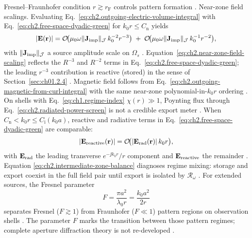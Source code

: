 Fresnel--Fraunhofer condition \(r\gtrsim r_{\mathrm{F}}\) controls pattern formation
\cite{harrington2001}.
Near-zone field scalings. Evaluating Eq.~\eqref{eq:ch2.outgoing-electric-volume-integral} with
Eq.~\eqref{eq:ch2.free-space-dyadic-green} for \(k_0 r\le C_{\mathrm{n}}\) yields
\begin{equation}
\label{eq:ch2.near-zone-field-scaling}
|\mathbf{E}(\mathbf{r})|
=
\mathcal{O}\!\big(\mu_0\omega\|\mathbf{J}_{\mathrm{imp}}\|_{\mathcal{J}}\,k_0^{-2} r^{-3}\big)
\;+\;
\mathcal{O}\!\big(\mu_0\omega\|\mathbf{J}_{\mathrm{imp}}\|_{\mathcal{J}}\,k_0^{-1} r^{-2}\big),
\end{equation}
with \(\|\mathbf{J}_{\mathrm{imp}}\|_{\mathcal{J}}\) a source amplitude scale on \(\Omega_s\)
\cite{stratton1941}. Equation~\eqref{eq:ch2.near-zone-field-scaling} reflects
the \(R^{-3}\) and \(R^{-2}\) terms in Eq.~\eqref{eq:ch2.free-space-dyadic-green}; the
leading \(r^{-3}\) contribution is reactive (stored) in the sense of
Section~\ref{sec:ch01.2.4} \cite{stratton1941}. Magnetic field follows from
Eq.~\eqref{eq:ch2.outgoing-magnetic-from-curl-integral} with the same near-zone
polynomial-in-\(k_0 r\) ordering \cite{harrington2001}. On shells with
Eq.~\eqref{eq:ch1.regime-index} \(\chi(r)\gg 1\), Poynting flux through
Eq.~\eqref{eq:ch2.radiated-power-screen} is not a credible export meter
\cite{stratton1941}.
When \(C_{\mathrm{n}}<k_0 r\le C_{\mathrm{i}}(k_0 a)\), reactive and radiative terms in
Eq.~\eqref{eq:ch2.free-space-dyadic-green} are comparable:
\begin{equation}
\label{eq:ch2.intermediate-zone-balance}
|\mathbf{E}_{\mathrm{reactive}}(\mathbf{r})|
=
\mathcal{O}\!\big(|\mathbf{E}_{\mathrm{rad}}(\mathbf{r})|\,k_0 r\big),
\end{equation}
with \(\mathbf{E}_{\mathrm{rad}}\) the leading transverse \(e^{-\jj k_0 r}/r\) component and
\(\mathbf{E}_{\mathrm{reactive}}\) the remainder \cite{stratton1941}. Equation
\eqref{eq:ch2.intermediate-zone-balance} diagnoses regime mixing: storage and export coexist
in the full field pair until export is isolated by \(\mathcal{R}_\omega\)
\cite{stratton1941}. For extended sources, the Fresnel parameter
\begin{equation}
\label{eq:ch2.fresnel-parameter}
F
=
\frac{\pi a^{2}}{\lambda_0 r}
=
\frac{k_0 a^{2}}{2r}
\end{equation}
separates Fresnel (\(F\gtrsim 1\)) from Fraunhofer (\(F\ll 1\)) pattern regions on
observation shells \cite{jackson1999}. The parameter \(F\) marks the transition between
those pattern regimes; complete aperture diffraction theory is not re-developed
\cite{stratton1941}.

